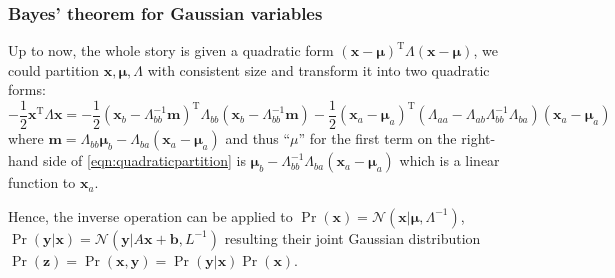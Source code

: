 \subsubsection{Bayes' theorem for Gaussian variables}
Up to now, the whole story is given a quadratic form
$(\mathbf{x}-\boldsymbol{\mu})^{\mathrm{T}}\Lambda(\mathbf{x}-\boldsymbol{\mu})$,
    we could partition $\mathbf{x},\boldsymbol{\mu},\Lambda$ with
    consistent size and transform it into two quadratic forms:
\begin{equation}
-\frac{1}{2}\mathbf{x}^{\mathrm{T}}\Lambda\mathbf{x}=-\frac{1}{2}(\mathbf{x}_{b}-\Lambda_{bb}^{-1}\mathbf{m})^{\mathrm{T}}\Lambda_{bb}(\mathbf{x}_{b}-\Lambda_{bb}^{-1}\mathbf{m})-\frac{1}{2}(\mathbf{x}_{a}-\boldsymbol{\mu}_a)^{\mathrm{T}}(\Lambda_{aa}-\Lambda_{ab}\Lambda_{bb}^{-1}\Lambda_{ba})(\mathbf{x}_{a}-\boldsymbol{\mu}_a)
\label{eqn:quadraticpartition}
\end{equation}
where
$\mathbf{m}=\Lambda_{bb}\boldsymbol{\mu}_{b}-\Lambda_{ba}(\mathbf{x}_{a}-\boldsymbol{\mu}_a)$
and thus ``$\mu$'' for the first term on the right-hand side of
\eqref{eqn:quadraticpartition} is
$\boldsymbol{\mu}_{b}-\Lambda_{bb}^{-1}\Lambda_{ba}(\mathbf{x}_{a}-\boldsymbol{\mu}_a)$
which is a linear function to $\mathbf{x}_a$.


Hence, the inverse operation can be applied to
$\Pr(\mathbf{x})=\mathcal{N}(\mathbf{x}\vert\boldsymbol{\mu},\Lambda^{-1})$,
    $\Pr(\mathbf{y}\vert\mathbf{x})=\mathcal{N}(\mathbf{y}\vert{}A\mathbf{x}+\mathbf{b},L^{-1})$
    resulting their joint Gaussian distribution
    $\Pr(\mathbf{z})=\Pr(\mathbf{x},\mathbf{y})=\Pr(\mathbf{y}\vert{}\mathbf{x})\Pr(\mathbf{x})$.


